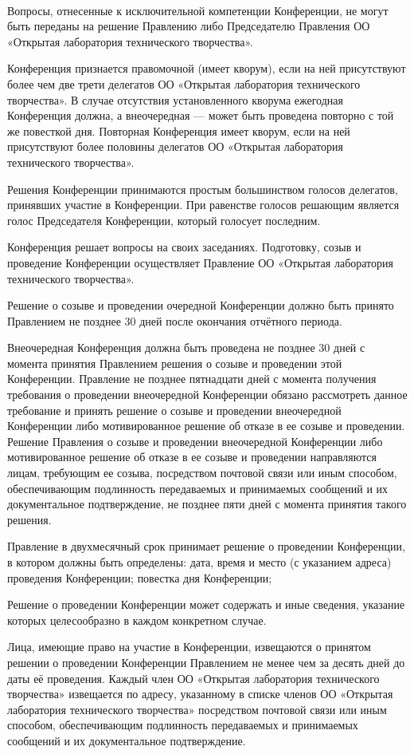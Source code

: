 \documentclass[a4paper,fontsize=14pt,titlepage]{scrartcl}
\makeatletter
\newenvironment{numberedpars}{%
  \addtocounter{secnumdepth}{1}
  \renewcommand\theparagraph{\arabic{section}.\arabic{paragraph}}
  \renewcommand\@seccntformat[1]
  {\expandafter\ifx\csname##1\endcsname\paragraph\csname 
  the##1\endcsname\else\csname the##1\endcsname\quad\fi}
  \let\old@par=\par
  \def\new@par{\let\par=\old@par\paragraph{}\let\par=\new@par}
  \let\par=\new@par
  \par
}{
  \addtocounter{secnumdepth}{-1}
}
\makeatother
\begin{document}
\begin{numberedpars}
Вопросы, отнесенные к исключительной компетенции Конференции, не могут быть переданы на решение Правлению либо
Председателю Правления ОО «Открытая лаборатория технического творчества».

Конференция признается правомочной (имеет кворум), если на ней присутствуют более чем две трети делегатов ОО «Открытая
лаборатория технического творчества». В случае отсутствия установленного кворума ежегодная Конференция должна, а
внеочередная — может быть проведена повторно с той же повесткой дня. Повторная Конференция имеет кворум, если на ней
присутствуют более половины делегатов ОО «Открытая лаборатория технического творчества».

Решения Конференции принимаются простым большинством голосов делегатов, принявших участие в Конференции. При равенстве
голосов решающим является голос Председателя Конференции, который голосует последним.

Конференция решает вопросы на своих заседаниях. Подготовку, созыв и проведение Конференции осуществляет Правление ОО
«Открытая лаборатория технического творчества».

Решение о созыве и проведении очередной Конференции должно быть принято Правлением не позднее 30 дней после окончания
отчётного периода.

Внеочередная Конференция должна быть проведена не позднее 30 дней с момента принятия Правлением решения о созыве и
проведении этой Конференции. Правление не позднее пятнадцати дней с момента получения требования о проведении
внеочередной Конференции обязано рассмотреть данное требование и принять решение о созыве и проведении внеочередной
Конференции либо мотивированное решение об отказе в ее созыве и проведении. Решение Правления о созыве и проведении
внеочередной Конференции либо мотивированное решение об отказе в ее созыве и проведении направляются лицам, требующим ее
созыва, посредством почтовой связи или иным способом, обеспечивающим подлинность передаваемых и принимаемых сообщений и
их документальное подтверждение, не позднее пяти дней с момента принятия такого решения.

Правление в двухмесячный срок принимает решение о проведении Конференции, в котором должны быть определены:
дата, время и место (с указанием адреса) проведения Конференции;
повестка дня Конференции;

Решение о проведении Конференции может содержать и иные сведения, указание которых целесообразно в каждом конкретном
случае.

Лица, имеющие право на участие в Конференции, извещаются о принятом решении о проведении Конференции Правлением не менее
чем за десять дней до даты её проведения. Каждый член ОО «Открытая лаборатория технического творчества» извещается по
адресу, указанному в списке членов ОО «Открытая лаборатория технического творчества» посредством почтовой связи или иным
способом, обеспечивающим подлинность передаваемых и принимаемых сообщений и их документальное подтверждение.


\end{numberedpars}
\end{document}

